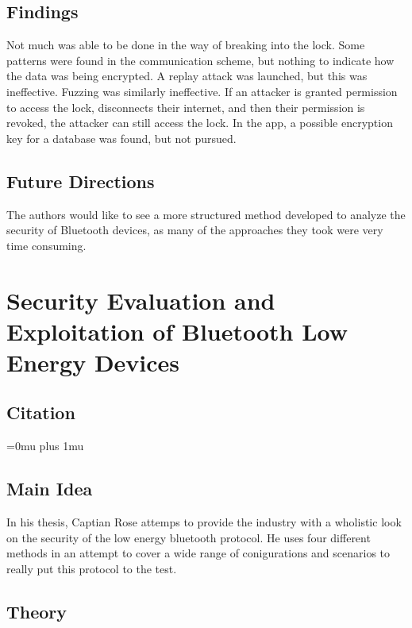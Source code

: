 \documentclass[letterpaper,12pt]{article}
\begin{document}
\subsection{Findings}

\noindent
Not much was able to be done in the way of breaking into the lock. Some patterns were found in the communication scheme, but nothing to indicate how the data was being encrypted. A replay attack was launched, but this was ineffective. Fuzzing was similarly ineffective. If an attacker is granted permission to access the lock, disconnects their internet, and then their permission is revoked, the attacker can still access the lock. In the app, a possible encryption key for a database was found, but not pursued. 

\subsection{Future Directions}

\noindent
The authors would like to see a more structured method developed to analyze the security of Bluetooth devices, as many of the approaches they took were very time consuming. 

\section{Security Evaluation and Exploitation of Bluetooth Low Energy Devices}

\noindent
\subsection{Citation}

\Urlmuskip=0mu plus 1mu\relax
{}

\subsection{Main Idea}

\noindent
In his thesis, Captian Rose attemps to provide the industry with a wholistic look on the security of the low energy bluetooth protocol. He uses four different methods in an attempt to cover a wide range of conigurations and scenarios to really put this protocol to the test.

\subsection{Theory}
\end{document}

